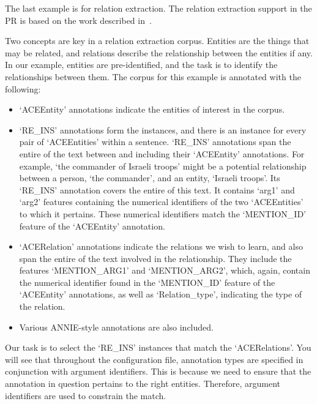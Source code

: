 
The last example is for relation extraction. The relation extraction support in
the PR is based on the work described in~\cite{Wang06}.

Two concepts are key in a relation extraction corpus. Entities are the things
that may be related, and relations describe the relationship between the
entities if any. In our example, entities are pre-identified, and the task is to
identify the relationships between them. The corpus for this example is
annotated with the following:

\begin{itemize}

\item `ACEEntity' annotations indicate the entities of interest in the corpus.

\item `RE\_INS' annotations form the instances, and there is an instance for
every pair of `ACEEntities' within a sentence. `RE\_INS' annotations span
the entire of the text between and including their `ACEEntity' annotations. For
example, `the commander of Israeli troops' might be a potential relationship
between a person, `the commander', and an entity, `Israeli troops'. Its
`RE\_INS' annotation covers the entire of this text. It contains `arg1' and
`arg2' features containing the numerical identifiers of the two `ACEEntities'
to which it pertains. These numerical identifiers match the `MENTION\_ID'
feature of the `ACEEntity' annotation.

\item `ACERelation' annotations indicate the relations we wish to learn, and
also span the entire of the text involved in the relationship. They include the
features `MENTION\_ARG1' and `MENTION\_ARG2', which, again, contain the
numerical identifier found in the `MENTION\_ID' feature of the `ACEEntity'
annotations, as well as `Relation\_type', indicating the type of the relation.

\item Various ANNIE-style annotations are also included.

\end{itemize}

Our task is to select the `RE\_INS' instances that match the `ACERelations'.
You will see that throughout the configuration file, annotation types are
specified in conjunction with argument identifiers. This is because we need to
ensure that the annotation in question pertains to the right entities. Therefore,
argument identifiers are used to constrain the match.

